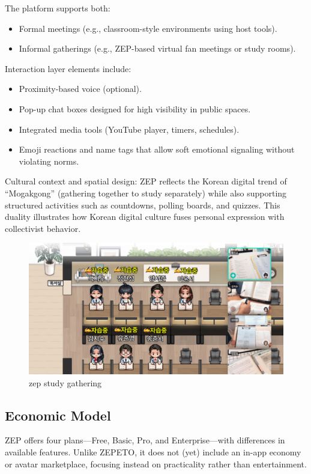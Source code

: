 The platform supports both:  
\begin{itemize}
    \item Formal meetings (e.g., classroom-style environments using host tools).  
    \item Informal gatherings (e.g., ZEP-based virtual fan meetings or study rooms).  
\end{itemize}

Interaction layer elements include:
\begin{itemize}
    \item Proximity-based voice (optional).  
    \item Pop-up chat boxes designed for high visibility in public spaces.  
    \item Integrated media tools (YouTube player, timers, schedules).  
    \item Emoji reactions and name tags that allow soft emotional signaling without violating norms.  
\end{itemize}

\cleardoublepage

Cultural context and spatial design:  
ZEP reflects the Korean digital trend of “Mogakgong” (gathering together to study separately) while also supporting structured activities such as countdowns, polling boards, and quizzes. This duality illustrates how Korean digital culture fuses personal expression with collectivist behavior.  

\begin{figure}
    \centering
    \includegraphics[width=1\linewidth]{template//images//chap4/zep_study.png}
    \caption{zep study gathering}
    \label{fig:placeholder}
\end{figure}

\cleardoublepage

\subsection{Economic Model}
ZEP offers four plans—Free, Basic, Pro, and Enterprise—with differences in available features. Unlike ZEPETO, it does not (yet) include an in-app economy or avatar marketplace, focusing instead on practicality rather than entertainment.  

